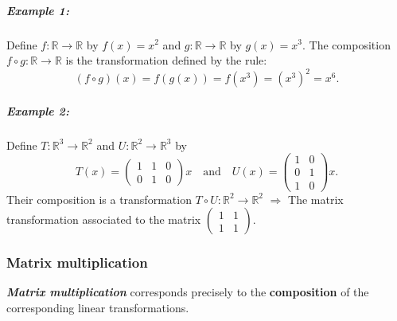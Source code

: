 \documentclass[a4paper,12pt]{article}
\begin{document}
\subparagraph{Example 1:}Define $f:\mathbb{R} \rightarrow \mathbb{R}$ by $f(x)=x^2$ and $g:\mathbb{R} \rightarrow \mathbb{R}$ by $g(x)=x^3$. The composition $f \circ g:\mathbb{R} \rightarrow \mathbb{R}$ is the transformation defined by the rule:
\[
(f \circ g)(x) = f(g(x)) = f(x^3) = (x^3)^2 = x^6.
\]

\subparagraph{Example 2:}Define $T:\mathbb{R}^3 \rightarrow \mathbb{R}^2$ and $U:\mathbb{R}^2 \rightarrow \mathbb{R}^3$ by 
\[
T(x) = \begin{pmatrix}
    1 & 1 & 0\\
    0 & 1 & 0
\end{pmatrix}x \quad \text{and} \quad U(x) = \begin{pmatrix}
    1 & 0 \\
    0 & 1 \\ 
    1 & 0
\end{pmatrix}x. 
\]
Their composition is a transformation $T \circ U: \mathbb{R}^2 \rightarrow \mathbb{R}^2$
$\Rightarrow$ The matrix transformation associated to the matrix $\begin{pmatrix}
    1 & 1\\
    1 & 1
\end{pmatrix}$.
\subsubsection{Matrix multiplication}\textbf{\textit{Matrix multiplication }}corresponds precisely to the \textbf{composition} of the corresponding linear transformations.
\end{document}
